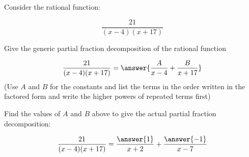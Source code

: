 \documentclass{ximera}
\author{Nicholas Hemleben}
\begin{document}
\begin{exercise}


Consider the rational function:

\[ 
\frac{21}{(x-4)(x+17)}
\]

Give the generic partial fraction decomposition of the rational function

\[
\frac{21}{(x-4)(x+17)} =
 \answer{\frac{A}{x-4} + \frac{B}{x+17}}
\]
(Use $A$ and $B$ for the constants and list the terms in the order written in the factored form and write the higher powers of repeated terms first)
\begin{exercise}
Find the values of $A$ and $B$ above to give the actual partial fraction decomposition:

\[
\frac{21}{(x-4)(x+17)} =
 \frac{\answer{1}}{x+2} + \frac{\answer{-1}}{x-7}
\]
\end{exercise}


\end{exercise}
\end{document}
